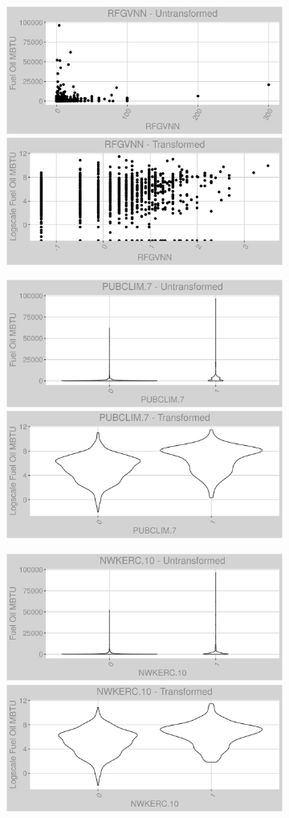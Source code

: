 \FloatBarrier
\newpage
\begin{figure}
\centering
\begin{subfigure}{1\textwidth}
\centering
\includegraphics[width=.49\textwidth, height=0.3\textheight]{Images/fuel_oil_var_original_15.png}
\includegraphics[width=.49\textwidth, height=0.3\textheight]{Images/fuel_oil_var_transformed_15.png}
\end{subfigure}
\begin{subfigure}{1\textwidth}
\centering
\includegraphics[width=.49\textwidth, height=0.3\textheight]{Images/fuel_oil_var_original_16.png}
\includegraphics[width=.49\textwidth, height=0.3\textheight]{Images/fuel_oil_var_transformed_16.png}
\end{subfigure}
\begin{subfigure}{1\textwidth}
\centering
\includegraphics[width=.49\textwidth, height=0.3\textheight]{Images/fuel_oil_var_original_17.png}
\includegraphics[width=.49\textwidth, height=0.3\textheight]{Images/fuel_oil_var_transformed_17.png}
\end{subfigure}
\end{figure}
